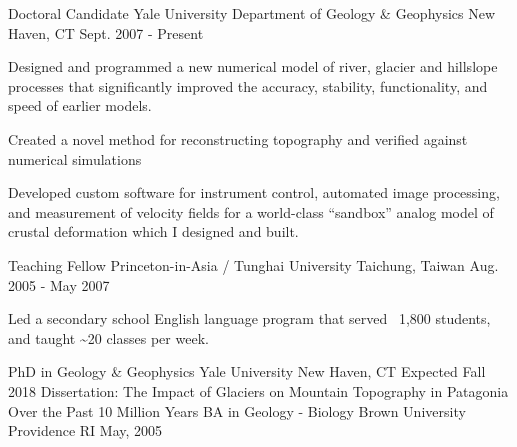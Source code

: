 \documentclass[11pt, letter]{awesome-cv}
\begin{document}
\begin{cventries}
{\begin{cvitems}
      \end{cvitems}
    }
  \cventry
    {Doctoral Candidate}
    {Yale University Department of Geology \& Geophysics}
    {New Haven, CT}
    {Sept. 2007 - Present}
    {
      \begin{cvitems}
        \item {Designed and programmed a new numerical model of river, glacier and hillslope processes that significantly improved the accuracy, stability, functionality, and speed of earlier models.}
        \item {Created a novel method for reconstructing topography and verified against numerical simulations}
        \item{Developed custom software for instrument control, automated image processing, and measurement of velocity fields for a world-class “sandbox” analog model of crustal deformation which I designed and built.}
      \end{cvitems} 
    }
  \cventry
    {Teaching Fellow}
    {Princeton-in-Asia / Tunghai University}
    {Taichung, Taiwan}
    {Aug. 2005 - May 2007}
    {
    \begin{cvitems}
      \item{Led a secondary school English language program that served ~1,800 students, and taught \textasciitilde20 classes per week.}
    \end{cvitems}
    }
\end{cventries}

\begin{cventries}
  \cventry
    {PhD in Geology \& Geophysics}
    {Yale University}
    {New Haven, CT}
    {Expected Fall 2018}
    {Dissertation: The Impact of Glaciers on Mountain Topography in Patagonia Over the Past 10 Million Years}
  \cventry
    {BA in Geology - Biology}
    {Brown University}
    {Providence RI}
    {May, 2005}
    {}
\end{cventries}
\end{document}
